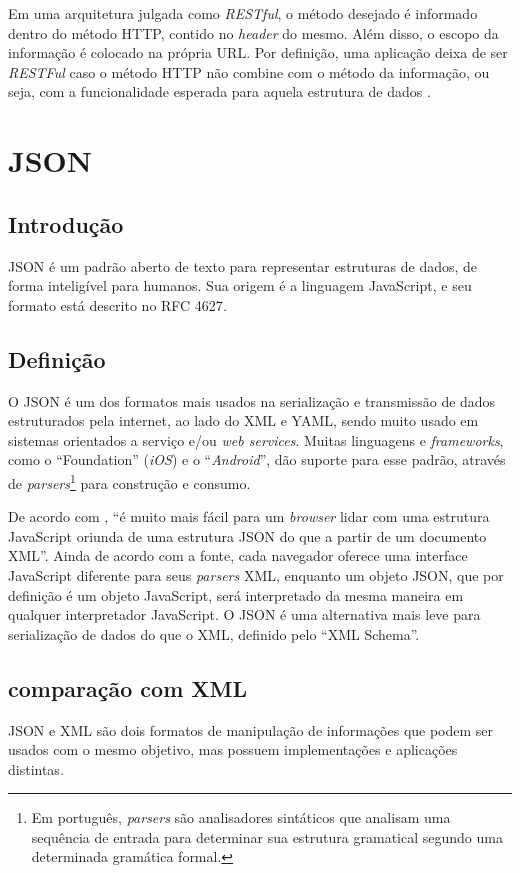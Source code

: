 	Em uma arquitetura julgada como \emph{RESTful}, o método desejado é informado dentro do método \ac{HTTP}, contido no \emph{header} do mesmo. Além disso, o escopo da informação é colocado na própria \ac{URL}. Por definição, uma aplicação deixa de ser \emph{RESTFul} caso o método \ac{HTTP} não combine com o método da informação, ou seja, com a funcionalidade esperada para aquela estrutura de dados \cite{restfulws}. 

\section{JSON}
\subsection{Introdução}
\ac{JSON} é um padrão aberto de texto para representar estruturas de dados, de forma inteligível para humanos.  Sua origem é a linguagem JavaScript, e seu formato está descrito no RFC 4627\cite{rfc4627}.

\subsection{Definição}
	O \ac{JSON} é um dos formatos mais usados na serialização e transmissão de dados estruturados pela internet, ao lado do \ac{XML} e \ac{YAML}, sendo muito usado em sistemas orientados a serviço e/ou \emph{web services}. Muitas linguagens e \emph{frameworks}, como o ``Foundation'' (\emph{iOS}) e o ``\emph{Android}'', dão suporte para esse padrão, através de \emph{parsers}\footnote{Em português, \emph{parsers} são analisadores sintáticos que analisam uma sequência de entrada para determinar sua estrutura gramatical segundo uma determinada gramática formal.} para construção e consumo.
	
De acordo com \cite{restfulws}, ``é muito mais fácil para um \emph{browser} lidar com uma estrutura JavaScript oriunda de uma estrutura \ac{JSON} do que a partir de um documento \ac{XML}''. Ainda de acordo com a fonte, cada navegador oferece uma interface JavaScript diferente para seus \emph{parsers} \ac{XML}, enquanto um objeto \ac{JSON}, que por definição é um objeto JavaScript, será interpretado da mesma maneira em qualquer interpretador JavaScript. O \ac{JSON} é uma alternativa mais leve para serialização de dados do que o \ac{XML}, definido pelo ``XML Schema''. 

\subsection{comparação com XML}
	\ac{JSON} e \ac{XML} são dois formatos de manipulação de informações que podem ser usados com o mesmo objetivo, mas possuem implementações e aplicações distintas. 

